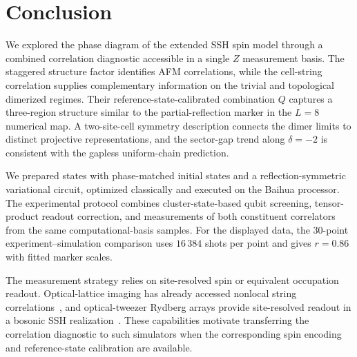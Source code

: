\section{Conclusion}
\label{sec:conclusion}

We explored the phase diagram of the extended SSH spin model through a combined correlation diagnostic accessible in a single $Z$ measurement basis.
The staggered structure factor identifies AFM correlations, while the cell-string correlation supplies complementary information on the trivial and topological dimerized regimes.
Their reference-state-calibrated combination $Q$ captures a three-region structure similar to the partial-reflection marker in the $L=8$ numerical map.
A two-site-cell symmetry description connects the dimer limits to distinct projective representations, and the sector-gap trend along $\delta=-2$ is consistent with the gapless uniform-chain prediction.

We prepared states with phase-matched initial states and a reflection-symmetric variational circuit, optimized classically and executed on the Baihua processor.
The experimental protocol combines cluster-state-based qubit screening, tensor-product readout correction, and measurements of both constituent correlators from the same computational-basis samples.
For the displayed data, the $30$-point experiment--simulation comparison uses $16\,384$ shots per point and gives $r=0.86$ with fitted marker scales.

The measurement strategy relies on site-resolved spin or equivalent occupation readout.
Optical-lattice imaging has already accessed nonlocal string correlations~\cite{endres2011observation}, and optical-tweezer Rydberg arrays provide site-resolved readout in a bosonic SSH realization~\cite{deleseleuc2019observation}.
These capabilities motivate transferring the correlation diagnostic to such simulators when the corresponding spin encoding and reference-state calibration are available.
